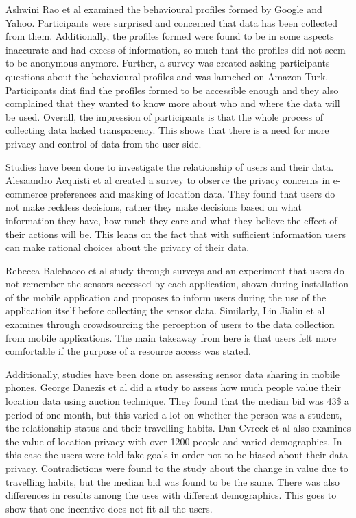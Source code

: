 Ashwini Rao et al \cite{rao2015they} examined the behavioural profiles formed by Google and Yahoo. Participants were surprised and concerned that data has been collected from them. Additionally, the profiles formed were found to be in some aspects inaccurate and had excess of information, so much that the profiles did not seem to be anonymous anymore. Further, a survey was created asking participants questions about the behavioural profiles and was launched on Amazon Turk. Participants dint find the profiles formed to be accessible enough and they also complained that they wanted to know more about who and where the data will be used. Overall, the impression of participants is that the whole process of collecting data lacked transparency. This shows that there is a need for more privacy and control of data from the user side.

Studies have been done to investigate the relationship of users and their data. Alesaandro Acquisti et al \cite{acquisti2005privacy} created a survey to observe the privacy concerns in e-commerce preferences and masking of location data. They found that users do not make reckless decisions, rather they make decisions based on what information they have, how much they care and what they believe the effect of their actions will be. This leans on the fact that with sufficient information users can make rational choices about the privacy of their data. 

Rebecca Balebacco et al \cite{balebako2015impact} study through surveys and an experiment that users do not remember the sensors accessed by each application, shown during installation of the mobile application and proposes to inform users during the use of the application itself before collecting the sensor data. Similarly, Lin Jialiu et al \cite{lin2012expectation} examines through crowdsourcing the perception of users to the data collection from mobile applications. The main takeaway from here is that users felt more comfortable if the purpose of a resource access was stated.

Additionally, studies have been done on assessing sensor data sharing in mobile phones. George Danezis et al \cite{danezis2005much} did a study to assess how much people value their location data using auction technique. They found that the median bid was 43\$ a period of one month, but this varied a lot on whether the person was a student, the relationship status and their travelling habits.  Dan Cvreck et al \cite{cvrcek2006study} also examines the value of location privacy with over 1200 people and varied demographics. In this case the users were told fake goals in order not to be biased about their data privacy. Contradictions were found to the study \cite{danezis2005much} about the change in value due to travelling habits, but the median bid was found to be the same. There was also differences in results among the uses with different demographics. This goes to show that one incentive does not fit all the users.

